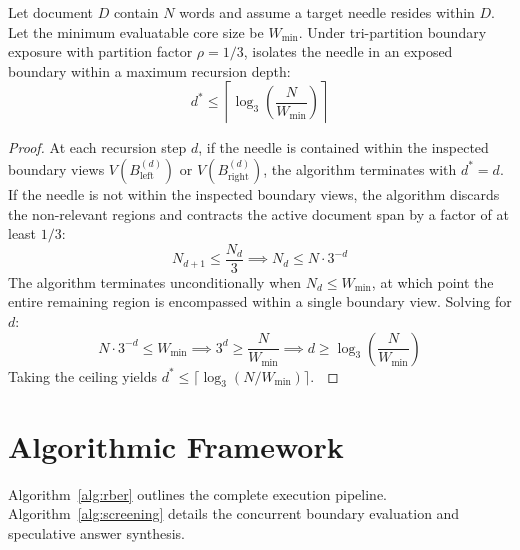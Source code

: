 \begin{theorem}
\label{thm:convergence}
Let document $D$ contain $N$ words and assume a target needle resides within $D$. Let the minimum evaluatable core size be $W_{\text{min}}$. Under tri-partition boundary exposure with partition factor $\rho = 1/3$, \RBER{} isolates the needle in an exposed boundary within a maximum recursion depth:
\begin{equation}
    d^* \le \left\lceil \log_3 \left( \frac{N}{W_{\text{min}}} \right) \right\rceil
\end{equation}
\end{theorem}

\begin{proof}
At each recursion step $d$, if the needle is contained within the inspected boundary views $V(B_{\text{left}}^{(d)})$ or $V(B_{\text{right}}^{(d)})$, the algorithm terminates with $d^* = d$. If the needle is not within the inspected boundary views, the algorithm discards the non-relevant regions and contracts the active document span by a factor of at least $1/3$:
\begin{equation}
    N_{d+1} \le \frac{N_d}{3} \implies N_d \le N \cdot 3^{-d}
\end{equation}
The algorithm terminates unconditionally when $N_d \le W_{\text{min}}$, at which point the entire remaining region is encompassed within a single boundary view. Solving for $d$:
\begin{equation}
    N \cdot 3^{-d} \le W_{\text{min}} \implies 3^d \ge \frac{N}{W_{\text{min}}} \implies d \ge \log_3\left(\frac{N}{W_{\text{min}}}\right)
\end{equation}
Taking the ceiling yields $d^* \le \lceil \log_3(N / W_{\text{min}}) \rceil$. $\qedhere$
\end{proof}

\section{Algorithmic Framework}
\label{sec:algorithm}

Algorithm~\ref{alg:rber} outlines the complete \RBER{} execution pipeline. Algorithm~\ref{alg:screening} details the concurrent boundary evaluation and speculative answer synthesis.

